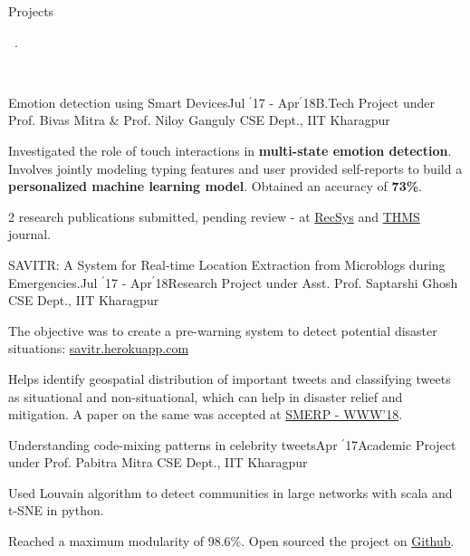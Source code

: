 \documentclass[11pt, a4paper]{resume}
\newcommand{\important}[1]{
	\textcolor{mypurple}{#1}
}
\newcommand{\fillit}[1]{
	\leavevmode\xleaders\hbox{#1}\hfill\kern0pt
}
\newcommand{\sectionSubtitleX}[1]{
	\begin{large}
    \important{#1}
    \end{large}
    \fillit{\important{.}}
}
\begin{document}
\sectionSubtitleX{Projects}
\\
\begin{rSubsection}{Emotion detection using Smart Devices}{Jul $^{\prime}$17 - Apr$^{\prime}$18}{B.Tech Project under Prof. Bivas Mitra \& Prof. Niloy Ganguly}{\hspace*{\fill} CSE Dept., IIT Kharagpur}
\item Investigated the role of touch interactions in {\bf multi-state emotion detection}. Involves jointly modeling typing features and  user provided self-reports to build a {\bf personalized machine learning model}. Obtained an accuracy of {\bf 73\%}.
\item 2 research publications submitted, pending review - at \href{https://recsys.acm.org/recsys18/}{RecSys} and \href{http://www.ieeesmc.org/publications/transactions-on-human-machine-systems}{THMS} journal.
\end{rSubsection}

\begin{rSubsection}{SAVITR: A System for Real-time Location Extraction from Microblogs during Emergencies.}{Jul $^{\prime}$17 - Apr$^{\prime}$18}{Research Project under Asst. Prof. Saptarshi Ghosh}{\hspace*{\fill} CSE Dept., IIT Kharagpur}
\item The objective was to create a pre-warning system to detect potential disaster situations: \href{http://savitr.herokuapp.com}{savitr.herokuapp.com}
\item Helps identify geospatial distribution of important tweets and classifying tweets as situational and non-situational, which can help in disaster relief and mitigation. A paper on the same was accepted at \href{https://www.cse.iitk.ac.in/users/kripa/smerp2018/}{SMERP - WWW'18}.
\end{rSubsection}

\begin{rSubsection}{Understanding code-mixing patterns in celebrity tweets}{Apr $^{\prime}$17}{Academic Project under Prof. Pabitra Mitra}{\hspace*{\fill} CSE Dept., IIT Kharagpur}
\item Used Louvain algorithm to detect communities in large networks with scala and t-SNE in python.
\item Reached a maximum modularity of 98.6\%. Open sourced the project on \href{https://github.com/kaustubhhiware/Graphwise}{Github}.
\end{rSubsection}
\end{document}

